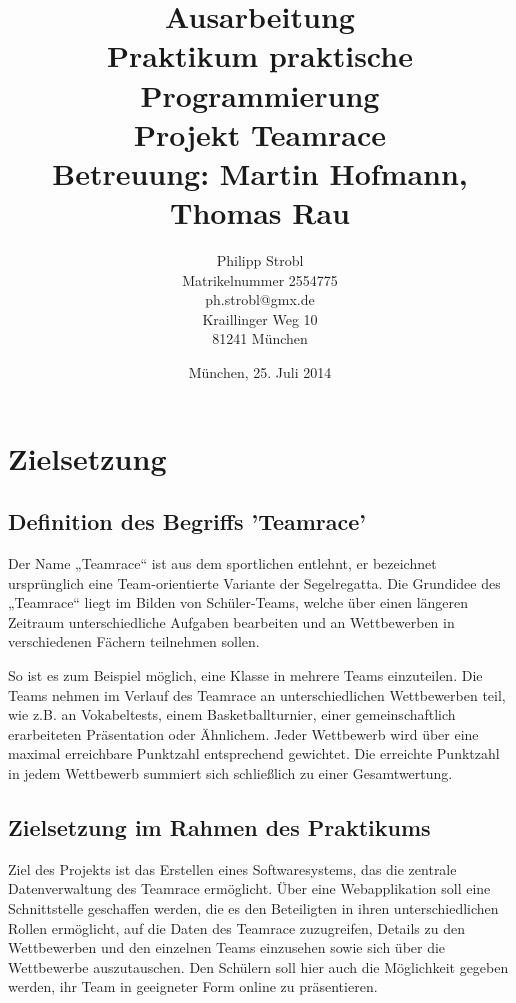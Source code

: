 \documentclass[12pt]{report}
\title{Ausarbeitung\bigskip\\
Praktikum praktische Programmierung\bigskip\\
\textbf{Projekt Teamrace}\bigskip\\
\large Betreuung: Martin Hofmann, Thomas Rau}
\author{Philipp Strobl\\Matrikelnummer 2554775\\
ph.strobl@gmx.de\\
Kraillinger Weg 10\\
81241 München}
\date{München, 25. Juli 2014}
\begin{document}
\maketitle
\pagebreak

\tableofcontents 


\chapter{Zielsetzung}

\section{Definition des Begriffs 'Teamrace'}

Der Name „Teamrace“ ist aus dem sportlichen entlehnt, er bezeichnet ursprünglich eine Team-orientierte Variante der Segelregatta. 
\cite{wiki:TeamRacing} Die Grundidee des „Teamrace“ liegt im Bilden von Schüler-Teams, welche über einen längeren Zeitraum unterschiedliche Aufgaben bearbeiten und an Wettbewerben in verschiedenen Fächern teilnehmen sollen.

So ist es zum Beispiel möglich, eine Klasse in mehrere Teams einzuteilen. Die Teams nehmen im Verlauf des Teamrace an unterschiedlichen Wettbewerben teil, wie z.B. an Vokabeltests, einem Basketballturnier, einer gemeinschaftlich erarbeiteten Präsentation oder Ähnlichem. Jeder Wettbewerb wird über eine maximal erreichbare Punktzahl entsprechend gewichtet. Die erreichte Punktzahl in jedem Wettbewerb summiert sich schließlich zu einer Gesamtwertung.

\section{Zielsetzung im Rahmen des Praktikums}
Ziel des Projekts ist das Erstellen eines Softwaresystems, das die zentrale Datenverwaltung des Teamrace ermöglicht. Über eine Webapplikation soll eine Schnittstelle geschaffen werden, die es den Beteiligten in ihren unterschiedlichen Rollen ermöglicht, auf die Daten des Teamrace zuzugreifen, Details zu den Wettbewerben und den einzelnen Teams einzusehen sowie sich über die Wettbewerbe auszutauschen. Den Schülern soll hier auch die Möglichkeit gegeben werden, ihr Team in geeigneter Form online zu präsentieren. 
\end{document}

